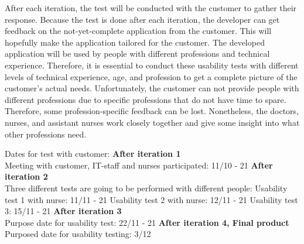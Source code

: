 \noindent After each iteration, the test will be conducted with the customer to gather their response. Because the test is done after each iteration, the developer can get feedback on the not-yet-complete application from the customer. This will hopefully make the application tailored for the customer. The developed application will be used by people with different professions and technical experience. Therefore, it is essential to conduct these usability tests with different levels of technical experience, age, and profession to get a complete picture of the customer's actual needs. Unfortunately, the customer can not provide people with different professions due to specific professions that do not have time to spare. Therefore, some profession-specific feedback can be lost. Nonetheless, the doctors, nurses, and assistant nurses work closely together and give some insight into what other professions need.
\newline

\noindent Dates for test with customer:\newline
\textbf{After iteration 1}\\
Meeting with customer, IT-staff and nurses participated: 11/10 - 21\newline
\textbf{After iteration 2}\\
Three different tests are going to be performed with different people:\newline
Usability test 1 with nurse: 11/11 - 21\newline
Usability test 2 with nurse: 12/11 - 21\newline
Usability test 3: 15/11 - 21\newline
\textbf{After iteration 3}\\
Purpose date for usability test: 22/11 - 21\newline
\textbf{After iteration 4, Final product}\\
Purposed date for usability testing: 3/12\newline

